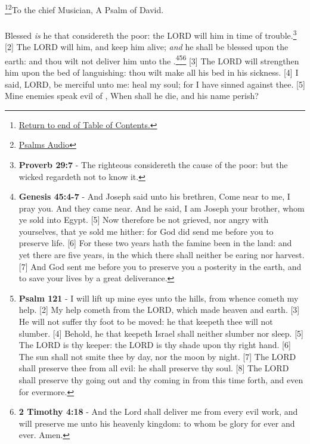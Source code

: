 \footnote{\textcolor[cmyk]{0.99998,1,0,0}{\hyperlink{TOC}{Return to end of Table of Contents.}}}\footnote{\href{https://audiobible.com/bible/}{\textcolor[cmyk]{0.99998,1,0,0}{Psalms Audio}}}\textcolor[cmyk]{0.99998,1,0,0}{To the chief Musician, A Psalm of David.}\\
\\
\textcolor[cmyk]{0.99998,1,0,0}{Blessed \emph{is} he that considereth the poor: the LORD will  him in time of trouble.}\footnote{\textbf{Proverb 29:7} - The righteous considereth the cause of the poor: but the wicked regardeth not to know it.}
[2] \textcolor[cmyk]{0.99998,1,0,0}{The LORD will  him, and keep him alive; \emph{and} he shall be blessed upon the earth: and thou wilt not deliver him unto the .}\footnote{\textbf{Genesis 45:4-7} -  And Joseph said unto his brethren, Come near to me, I pray you. And they came near. And he said, I am Joseph your brother, whom ye sold into Egypt. [5] Now therefore be not grieved, nor angry with yourselves, that ye sold me hither: for God did send me before you to preserve life. [6] For these two years hath the famine been in the land: and yet there are five years, in the which there shall neither be earing nor harvest. [7] And God sent me before you to preserve you a posterity in the earth, and to save your lives by a great deliverance.}\footnote{\textbf{Psalm 121} - I will lift up mine eyes unto the hills, from whence cometh my help. [2] My help cometh from the LORD, which made heaven and earth. [3] He will not suffer thy foot to be moved: he that keepeth thee will not slumber. [4] Behold, he that keepeth Israel shall neither slumber nor sleep. [5] The LORD is thy keeper: the LORD is thy shade upon thy right hand. [6] The sun shall not smite thee by day, nor the moon by night. [7] The LORD shall preserve thee from all evil: he shall preserve thy soul. [8] The LORD shall preserve thy going out and thy coming in from this time forth, and even for evermore.}\footnote{\textbf{2 Timothy 4:18} - And the Lord shall deliver me from every evil work, and will preserve me unto his heavenly kingdom: to whom be glory for ever and ever. Amen.}
[3] \textcolor[cmyk]{0.99998,1,0,0}{The LORD will strengthen him upon the bed of languishing: thou wilt make all his bed in his sickness.}
[4] \textcolor[cmyk]{0.99998,1,0,0}{I said, LORD, be merciful unto me: heal my soul; for I have sinned against thee.}
[5] \textcolor[cmyk]{0.99998,1,0,0}{Mine enemies speak evil of , When shall he die, and his name perish?}

